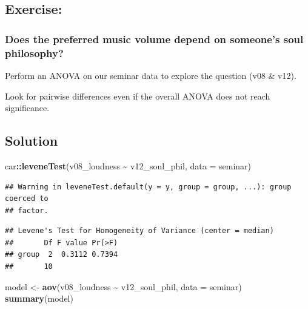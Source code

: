 \documentclass[
]{book}
\newenvironment{Shaded}{\begin{snugshade}}{\end{snugshade}}
\newcommand{\AttributeTok}[1]{\textcolor[rgb]{0.13,0.29,0.53}{#1}}
\newcommand{\FunctionTok}[1]{\textcolor[rgb]{0.13,0.29,0.53}{\textbf{#1}}}
\newcommand{\NormalTok}[1]{#1}
\newcommand{\OtherTok}[1]{\textcolor[rgb]{0.56,0.35,0.01}{#1}}
\newcommand{\SpecialCharTok}[1]{\textcolor[rgb]{0.81,0.36,0.00}{\textbf{#1}}}
\begin{document}
\subsection{Exercise:}\label{exercise-10}

\subsubsection{\texorpdfstring{Does the preferred music volume depend on someone's soul philosophy? }{Does the preferred music volume depend on someone's soul philosophy? }}\label{does-the-preferred-music-volume-depend-on-someones-soul-philosophy}

Perform an ANOVA on our seminar data to explore the question (v08 \& v12).

Look for pairwise differences even if the overall ANOVA does not reach significance.

\subsection{\texorpdfstring{Solution }{Solution }}\label{solution-14}

\begin{Shaded}
\begin{Highlighting}[]
\NormalTok{car}\SpecialCharTok{::}\FunctionTok{leveneTest}\NormalTok{(v08\_loudness }\SpecialCharTok{\textasciitilde{}}\NormalTok{ v12\_soul\_phil, }\AttributeTok{data =}\NormalTok{ seminar)}
\end{Highlighting}
\end{Shaded}

\begin{verbatim}
## Warning in leveneTest.default(y = y, group = group, ...): group coerced to
## factor.
\end{verbatim}

\begin{verbatim}
## Levene's Test for Homogeneity of Variance (center = median)
##       Df F value Pr(>F)
## group  2  0.3112 0.7394
##       10
\end{verbatim}

\begin{Shaded}
\begin{Highlighting}[]
\NormalTok{model }\OtherTok{\textless{}{-}} \FunctionTok{aov}\NormalTok{(v08\_loudness }\SpecialCharTok{\textasciitilde{}}\NormalTok{ v12\_soul\_phil, }\AttributeTok{data =}\NormalTok{ seminar)}
\FunctionTok{summary}\NormalTok{(model)}
\end{Highlighting}
\end{Shaded}
\end{document}
